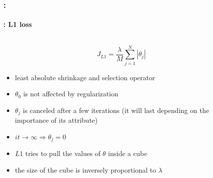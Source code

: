 \documentclass[xcolor=table]{beamer}%
\begin{document}
\begin{frame}
	\frametitle{\insertshortsubtitle: \insertsection}
	\framesubtitle{\insertsubsection: L1 loss}
	
	\begin{columns}
		\begin{column}{.64\textwidth}
			\[J_{L1} = \frac{\lambda}{M} \sum_{j=1}^{N} |\theta_j|\]
	
			\begin{itemize}
				\item least absolute shrinkage and selection operator
				\item $\theta_0$ is not affected by regularization
				\item $\theta_j$ is canceled after a few iterations (it will last depending on the importance of its attribute)
				\item $it \rightarrow \infty \Rightarrow \theta_j = 0$
				\item $L1$ tries to pull the values of $\theta$ inside a cube
				\item the size of the cube is inversely proportional to $\lambda$
			\end{itemize}
		\end{column}
		\begin{column}{.35\textwidth}
		\end{column}
	\end{columns}
	
\end{frame}
\end{document}
